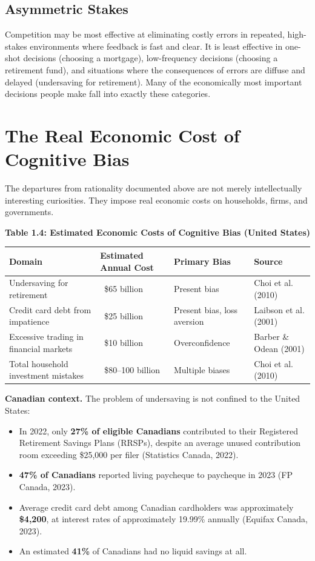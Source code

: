 \documentclass[12pt, letterpaper]{article}
\begin{document}
\subsection{Asymmetric Stakes}


Competition may be most effective at eliminating costly errors in repeated, high-stakes environments where feedback is fast and clear. It is least effective in one-shot decisions (choosing a mortgage), low-frequency decisions (choosing a retirement fund), and situations where the consequences of errors are diffuse and delayed (undersaving for retirement). Many of the economically most important decisions people make fall into exactly these categories.

\newpage


\section{The Real Economic Cost of Cognitive Bias}


The departures from rationality documented above are not merely intellectually interesting curiosities. They impose real economic costs on households, firms, and governments.

\textbf{Table 1.4: Estimated Economic Costs of Cognitive Bias (United States)}


\begin{table}[H]
\centering
\small
\begin{tabularx}{\linewidth}{lXXX}
\toprule
Domain & Estimated Annual Cost & Primary Bias & Source \\
\midrule
Undersaving for retirement & ~\$65 billion & Present bias & Choi et al. (2010) \\
Credit card debt from impatience & ~\$25 billion & Present bias, loss aversion & Laibson et al. (2001) \\
Excessive trading in financial markets & ~\$10 billion & Overconfidence & Barber \& Odean (2001) \\
Total household investment mistakes & ~\$80--100 billion & Multiple biases & Choi et al. (2010) \\
\bottomrule
\end{tabularx}
\end{table}


\textbf{Canadian context.} The problem of undersaving is not confined to the United States:
\begin{itemize}
\item In 2022, only \textbf{27\% of eligible Canadians} contributed to their Registered Retirement Savings Plans (RRSPs), despite an average unused contribution room exceeding \$25,000 per filer (Statistics Canada, 2022).
\item \textbf{47\% of Canadians} reported living paycheque to paycheque in 2023 (FP Canada, 2023).
\item Average credit card debt among Canadian cardholders was approximately \textbf{\$4,200}, at interest rates of approximately 19.99\% annually (Equifax Canada, 2023).
\item An estimated \textbf{41\%} of Canadians had no liquid savings at all.
\end{itemize}
\end{document}
